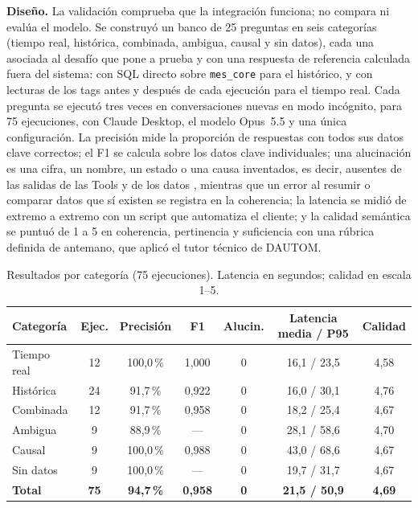 \documentclass[11pt,letterpaper]{article}
\begin{document}
\textbf{Diseño.} La validación comprueba que la integración funciona; no compara ni evalúa el modelo. Se construyó un banco de 25 preguntas en seis categorías (tiempo real, histórica, combinada, ambigua, causal y sin datos), cada una asociada al desafío que pone a prueba y con una respuesta de referencia calculada fuera del sistema: con SQL directo sobre \texttt{mes\_core} para el histórico, y con lecturas de los tags antes y después de cada ejecución para el tiempo real. Cada pregunta se ejecutó tres veces en conversaciones nuevas en modo incógnito, para 75 ejecuciones, con Claude Desktop, el modelo Opus~5.5 y una única configuración. La precisión mide la proporción de respuestas con todos sus datos clave correctos; el F1 se calcula sobre los datos clave individuales; una alucinación es una cifra, un nombre, un estado o una causa inventados, es decir, ausentes de las salidas de las Tools y de los datos \cite{Ji2023Hallucination}, mientras que un error al resumir o comparar datos que sí existen se registra en la coherencia; la latencia se midió de extremo a extremo con un script que automatiza el cliente; y la calidad semántica se puntuó de 1 a 5 en coherencia, pertinencia y suficiencia con una rúbrica definida de antemano, que aplicó el tutor técnico de DAUTOM.

\begin{table}[H]
\centering\small
\caption{Resultados por categoría (75 ejecuciones). Latencia en segundos; calidad en escala 1--5.}\label{tab:res}
\begin{tabular}{@{}lcccccc@{}}
\toprule
\textbf{Categoría} & \textbf{Ejec.} & \textbf{Precisión} & \textbf{F1} & \textbf{Alucin.} & \textbf{Latencia media / P95} & \textbf{Calidad} \\
\midrule
Tiempo real & 12 & 100,0\,\% & 1,000 & 0 & 16,1 / 23,5 & 4,58 \\
Histórica & 24 & 91,7\,\% & 0,922 & 0 & 16,0 / 30,1 & 4,76 \\
Combinada & 12 & 91,7\,\% & 0,958 & 0 & 18,2 / 25,4 & 4,67 \\
Ambigua & 9 & 88,9\,\% & --- & 0 & 28,1 / 58,6 & 4,70 \\
Causal & 9 & 100,0\,\% & 0,988 & 0 & 43,0 / 68,6 & 4,67 \\
Sin datos & 9 & 100,0\,\% & --- & 0 & 19,7 / 31,7 & 4,67 \\
\midrule
\textbf{Total} & \textbf{75} & \textbf{94,7\,\%} & \textbf{0,958} & \textbf{0} & \textbf{21,5 / 50,9} & \textbf{4,69} \\
\bottomrule
\end{tabular}
\end{table}
\end{document}
